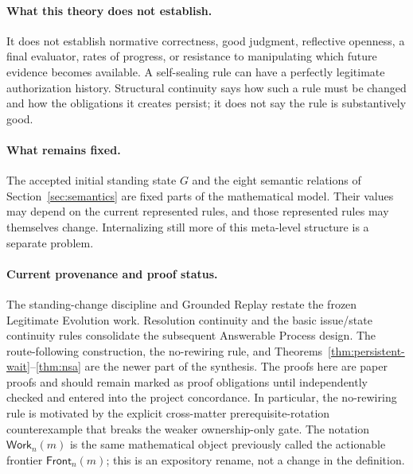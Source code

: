 \documentclass[11pt]{article}
\theoremstyle{definition}
\theoremstyle{remark}
\newcommand{\Work}{\mathsf{Work}}
\begin{document}
\paragraph{What this theory does not establish.}
It does not establish normative correctness, good judgment, reflective
openness, a final evaluator, rates of progress, or resistance to manipulating
which future evidence becomes available. A self-sealing rule can have a
perfectly legitimate authorization history. Structural continuity says how
such a rule must be changed and how the obligations it creates persist; it does
not say the rule is substantively good.

\paragraph{What remains fixed.}
The accepted initial standing state $G$ and the eight semantic relations of
Section~\ref{sec:semantics} are fixed parts of the mathematical model. Their
values may depend on the current represented rules, and those represented rules
may themselves change. Internalizing still more of this meta-level structure is
a separate problem.

\paragraph{Current provenance and proof status.}
The standing-change discipline and Grounded Replay restate the frozen
Legitimate Evolution work. Resolution continuity and the basic issue/state
continuity rules consolidate the subsequent Answerable Process design.
The route-following construction, the no-rewiring rule, and
Theorems~\ref{thm:persistent-wait}--\ref{thm:nsa} are the newer part of the
synthesis. The proofs here are paper proofs and should remain marked as proof
obligations until independently checked and entered into the project
concordance. In particular, the no-rewiring rule is motivated by the explicit
cross-matter prerequisite-rotation counterexample that breaks the weaker
ownership-only gate. The notation $\Work_n(m)$ is the same mathematical object
previously called the actionable frontier $\mathsf{Front}_n(m)$; this is an
expository rename, not a change in the definition.
\end{document}
